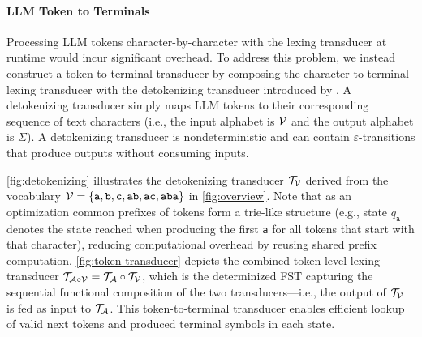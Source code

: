 


\paragraph{LLM Token to Terminals}





Processing LLM tokens character-by-character with the lexing transducer at runtime would incur significant overhead.
To address this problem, we instead construct a token-to-terminal transducer by composing the character-to-terminal lexing transducer with the detokenizing transducer introduced by \citet{koo2024automatabased}.
A detokenizing transducer simply maps LLM tokens to their corresponding sequence of text characters (i.e., the input alphabet is $\mathcal{V}$ and the output alphabet is $\Sigma$).
% 
A detokenizing transducer is nondeterministic and can contain $\varepsilon$-transitions that produce outputs without consuming inputs.

\autoref{fig:detokenizing} illustrates the detokenizing transducer $\mathcal{T}_{\mathcal{V}}$ derived from the vocabulary $\mathcal{V} = \{\texttt{a}, \texttt{b}, \texttt{c}, \texttt{ab}, \texttt{ac}, \texttt{aba}\}$ in \autoref{fig:overview}.
Note that as an optimization common prefixes of tokens form a trie-like structure (e.g., state $q_\texttt{a}$ denotes the state reached when producing the first \texttt{a} for all tokens that start with that character), reducing computational overhead by reusing shared prefix computation.
\autoref{fig:token-transducer} depicts the combined token-level lexing transducer $\mathcal{T}_{\mathcal{A} \circ \mathcal{V}}=\mathcal{T}_{\mathcal{A}} \circ \mathcal{T}_{\mathcal{V}}$, which is the determinized FST capturing the sequential functional composition of the two transducers---i.e., the output of $\mathcal{T}_{\mathcal{V}}$ is fed as input to $\mathcal{T}_{\mathcal{A}}$.
This token-to-terminal transducer enables efficient lookup of valid next tokens and produced terminal symbols in each state.



